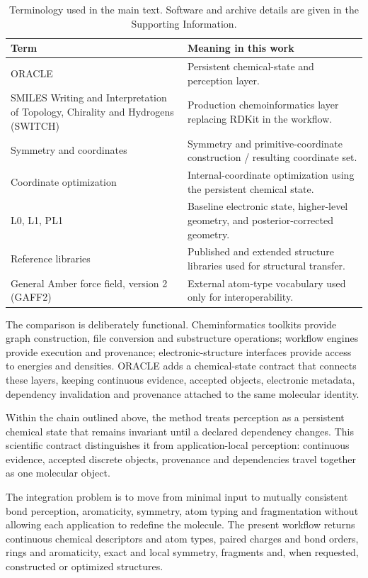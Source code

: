 \documentclass[journal=jctcce,manuscript=article]{achemso}
\begin{document}
\begin{table}[t]
\centering
\scriptsize
\caption{Terminology used in the main text.  Software and archive details are
given in the Supporting Information.}
\label{tab:terminology}
\begin{tabularx}{\linewidth}{@{}lX@{}}
\toprule
Term & Meaning in this work \\
\midrule
ORACLE & Persistent chemical-state and perception layer. \\
SMILES Writing and Interpretation of Topology, Chirality and Hydrogens (SWITCH) & Production chemoinformatics layer replacing RDKit in the workflow. \\
Symmetry and coordinates & Symmetry and primitive-coordinate construction / resulting coordinate set. \\
Coordinate optimization & Internal-coordinate optimization using the persistent chemical state. \\
L0, L1, PL1 & Baseline electronic state, higher-level geometry, and posterior-corrected geometry. \\
Reference libraries & Published and extended structure libraries used for structural transfer. \\
General Amber force field, version 2 (GAFF2) & External atom-type vocabulary used only for interoperability. \\
\bottomrule
\end{tabularx}
\end{table}

The comparison is deliberately functional.  Cheminformatics toolkits provide
graph construction, file conversion and substructure operations; workflow
engines provide execution and provenance; electronic-structure interfaces
provide access to energies and densities.  ORACLE adds a chemical-state
contract that connects these layers, keeping continuous evidence, accepted
objects, electronic metadata, dependency invalidation and provenance attached
to the same molecular identity.

Within the chain outlined above, the method treats perception as a persistent
chemical state that remains invariant until a declared dependency changes.
This scientific contract distinguishes it from application-local perception:
continuous evidence, accepted discrete objects, provenance and dependencies
travel together as one molecular object.

The integration problem is to move from minimal input to mutually consistent
bond perception, aromaticity, symmetry, atom typing and fragmentation without
allowing each application to redefine the molecule.  The present workflow
returns continuous chemical descriptors and atom types, paired charges and
bond orders, rings and aromaticity, exact and local symmetry, fragments and,
when requested, constructed or optimized structures.
\end{document}
